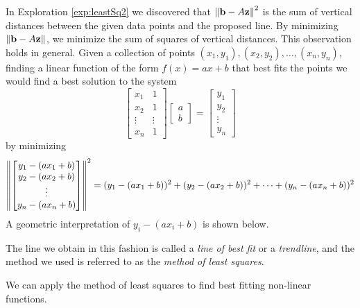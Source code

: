 \documentclass{ximera}
\begin{document}
In Exploration \ref{exp:leastSq2} we discovered that $\left\lVert\mathbf{b}-A\mathbf{z}\right\rVert^2$ is the sum of vertical distances between the given data points and the proposed line.  By minimizing $\left\lVert\mathbf{b}-A\mathbf{z}\right\rVert$, we minimize the sum of squares of vertical distances.  This observation holds in general.  Given a collection of points $(x_1, y_1), (x_2, y_2),\dots ,(x_n, y_n)$, finding a linear function of the form $f(x)=ax+b$ that best fits the points we would find a best solution to the system
$$\begin{bmatrix}x_1&1\\x_2&1\\\vdots&\vdots\\x_n&1\end{bmatrix}\begin{bmatrix}a\\b\end{bmatrix}=\begin{bmatrix}y_1\\y_2\\\vdots\\y_n\end{bmatrix}$$
by minimizing
$$\left\lVert\begin{bmatrix}y_1-(ax_1+b)\\y_2-(ax_2+b)\\\vdots\\y_n-(ax_n+b)\end{bmatrix}\right\rVert^2=(y_1-(ax_1+b))^2+(y_2-(ax_2+b))^2+\dots +(y_n-(ax_n+b))^2$$
A geometric interpretation of $y_i-(ax_i+b)$ is shown below.


\begin{center}
 \end{center}

 The line we obtain in this fashion is called a \emph{line of best fit} or a \emph{trendline}, and the method we used is referred to as the  \emph{method of least squares}.

 We can apply the method of least squares to find best fitting non-linear functions.  
\end{document}
